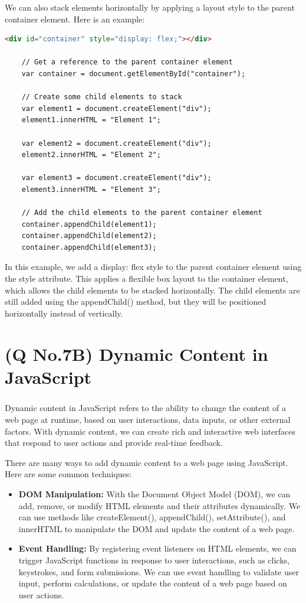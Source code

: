 \documentclass[11pt]{article}
\begin{document}
We can also stack elements horizontally by applying a layout style to the parent container element. Here is an example:
\begin{lstlisting}[language=html]
    <div id="container" style="display: flex;"></div>

    // Get a reference to the parent container element
    var container = document.getElementById("container");

    // Create some child elements to stack
    var element1 = document.createElement("div");
    element1.innerHTML = "Element 1";

    var element2 = document.createElement("div");
    element2.innerHTML = "Element 2";

    var element3 = document.createElement("div");
    element3.innerHTML = "Element 3";

    // Add the child elements to the parent container element
    container.appendChild(element1);
    container.appendChild(element2);
    container.appendChild(element3);

\end{lstlisting}
In this example, we add a display: flex style to the parent container element using the style attribute. This applies a flexible box layout to the container element, which allows the child elements to be stacked horizontally. The child elements are still added using the appendChild() method, but they will be positioned horizontally instead of vertically.


\section{(Q No.7B) Dynamic Content in JavaScript} 
\subparagraph{}
Dynamic content in JavaScript refers to the ability to change the content of a web page at runtime, based on user interactions, data inputs, or other external factors. With dynamic content, we can create rich and interactive web interfaces that respond to user actions and provide real-time feedback.

There are many ways to add dynamic content to a web page using JavaScript. Here are some common techniques:

\begin{itemize}
    \item \textbf{DOM Manipulation:} With the Document Object Model (DOM), we can add, remove, or modify HTML elements and their attributes dynamically. We can use methods like createElement(), appendChild(), setAttribute(), and innerHTML to manipulate the DOM and update the content of a web page.

    \item \textbf{Event Handling:} By registering event listeners on HTML elements, we can trigger JavaScript functions in response to user interactions, such as clicks, keystrokes, and form submissions. We can use event handling to validate user input, perform calculations, or update the content of a web page based on user actions.
\end{itemize}
    
\end{document}

